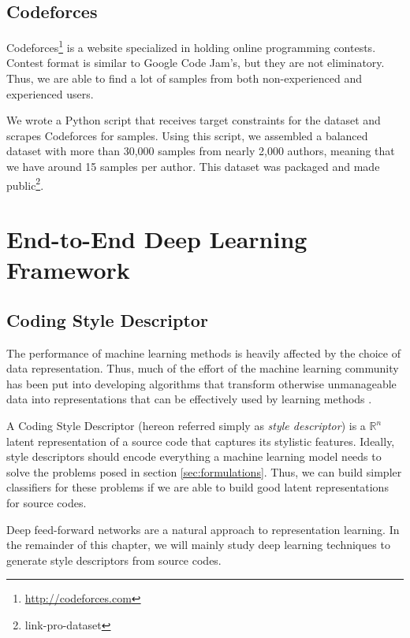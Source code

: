 \subsection{Codeforces}\label{sec:codeforces}

Codeforces\footnote{\url{http://codeforces.com}} is a website specialized in holding online programming contests. Contest format is similar to Google Code Jam's, but they are not eliminatory. Thus, we are able to find a lot of samples from both non-experienced and experienced users.

We wrote a Python script that receives target constraints for the dataset and scrapes Codeforces for samples. Using this script, we assembled a balanced dataset with more than 30,000 samples from nearly 2,000 authors, meaning that we have around 15 samples per author. This dataset was packaged and made public\footnote{link-pro-dataset}.

\section{End-to-End Deep Learning Framework}\label{sec:framework}
\subsection{Coding Style Descriptor}

The performance of machine learning methods is heavily affected by the choice of data representation. Thus, much of the effort of the machine learning community has been put into developing algorithms that transform otherwise unmanageable data into representations that can be effectively used by learning methods \cite{representation_learning}.

A Coding Style Descriptor (hereon referred simply as \textit{style descriptor}) is a $\mathbb{R}^n$ latent representation of a source code that captures its stylistic features. Ideally, style descriptors should encode everything a machine learning model needs to solve the problems posed in section \ref{sec:formulations}. Thus, we can build simpler classifiers for these problems if we are able to build good latent representations for source codes.

Deep feed-forward networks are a natural approach to representation learning. In the remainder of this chapter, we will mainly study deep learning techniques to generate style descriptors from source codes.

